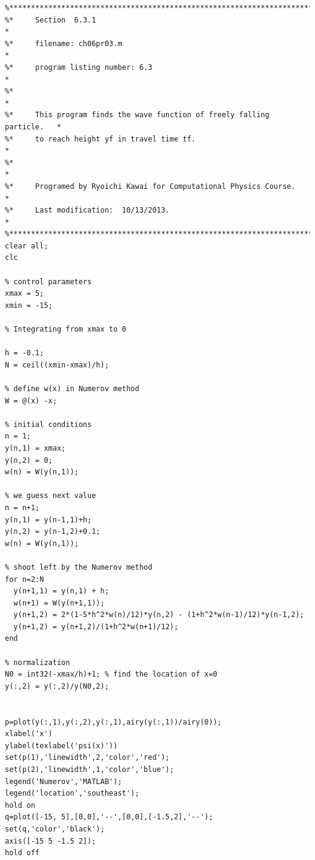 \footnotesize
\begin{verbatim}
%**************************************************************************
%*     Section  6.3.1                                                     *
%*     filename: ch06pr03.m                                               *
%*     program listing number: 6.3                                        *
%*                                                                        *
%*     This program finds the wave function of freely falling particle.   *
%*     to reach height yf in travel time tf.                              *
%*                                                                        *
%*     Programed by Ryoichi Kawai for Computational Physics Course.       *
%*     Last modification:  10/13/2013.                                    *
%**************************************************************************
clear all;
clc

% control parameters
xmax = 5;
xmin = -15;

% Integrating from xmax to 0

h = -0.1;
N = ceil((xmin-xmax)/h);

% define w(x) in Numerov method
W = @(x) -x;

% initial conditions
n = 1;
y(n,1) = xmax;
y(n,2) = 0;
w(n) = W(y(n,1));

% we guess next value
n = n+1;
y(n,1) = y(n-1,1)+h;
y(n,2) = y(n-1,2)+0.1;
w(n) = W(y(n,1));

% shoot left by the Numerov method
for n=2:N
  y(n+1,1) = y(n,1) + h;
  w(n+1) = W(y(n+1,1));
  y(n+1,2) = 2*(1-5*h^2*w(n)/12)*y(n,2) - (1+h^2*w(n-1)/12)*y(n-1,2); 
  y(n+1,2) = y(n+1,2)/(1+h^2*w(n+1)/12);
end

% normalization
N0 = int32(-xmax/h)+1; % find the location of x=0
y(:,2) = y(:,2)/y(N0,2);


p=plot(y(:,1),y(:,2),y(:,1),airy(y(:,1))/airy(0));
xlabel('x')
ylabel(texlabel('psi(x)'))
set(p(1),'linewidth',2,'color','red');
set(p(2),'linewidth',1,'color','blue');
legend('Numerov','MATLAB');
legend('location','southeast');
hold on
q=plot([-15, 5],[0,0],'--',[0,0],[-1.5,2],'--');
set(q,'color','black');
axis([-15 5 -1.5 2]);
hold off
\end{verbatim}
\normalsize

\bigskip
\noindent
\program
\label{prog:heating_rod}

